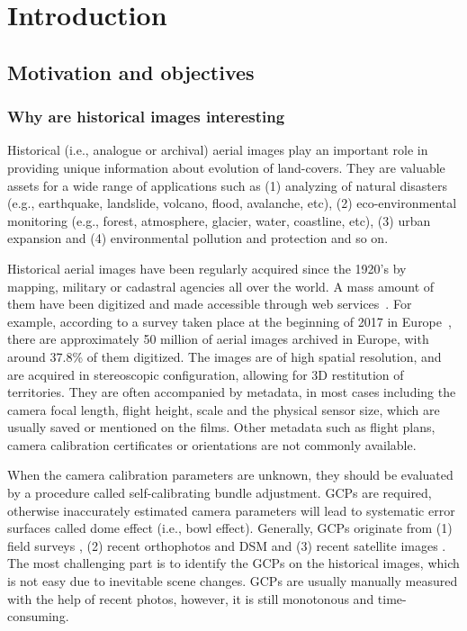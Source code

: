 
\chapter{Introduction}
\label{chap:intro}
\minitoc

\section{Motivation and objectives}
\subsection{Why are historical images interesting}
Historical (i.e., analogue or archival) aerial images play an important role in providing unique information about evolution of land-covers. 
They are valuable assets for a wide range of applications such as (1) analyzing of natural disasters (e.g., earthquake, landslide, volcano, flood, avalanche, etc), (2) eco-environmental monitoring (e.g., forest, atmosphere, glacier, water, coastline, etc), (3) urban expansion and (4) environmental pollution and protection and so on.
\par
Historical aerial images have been regularly acquired since the 1920’s by mapping, military or cadastral agencies all over the world. A mass amount of them have been digitized and made accessible through web services~\cite{sebastien2019archiving,earthexplorer,remonterletemps}. 
For example, according to a survey taken place at the beginning of 2017 in Europe~\cite{sebastien2019archiving}, there are approximately 50 million of aerial images archived in Europe, with around 37.8\% of them digitized. 
The images are of high spatial resolution, and are acquired in stereoscopic configuration, allowing for 3D restitution of territories. 
They are often accompanied by metadata, in most cases including the camera focal length, flight height, scale and the physical sensor size, which are usually saved or mentioned on the films. Other metadata such as flight plans, camera calibration certificates or orientations are not commonly available. 
\par
When the camera calibration parameters are unknown, they should be evaluated by a procedure called self-calibrating bundle adjustment. \ac{GCP}s are required, otherwise inaccurately estimated camera parameters will lead to systematic error surfaces called dome effect (i.e., bowl effect).
Generally, \ac{GCP}s originate from (1) field surveys \cite{micheletti2015application,walstra2004time,cardenal2006use}, (2) recent orthophotos and \ac{DSM} \cite{nurminen2015automation,ellis2006measuring,fox2008unlocking} and (3) recent satellite images \cite{ellis2006measuring,ford2013shoreline}. The most challenging part is to identify the \ac{GCP}s on the historical images, which is not easy due to inevitable scene changes. \ac{GCP}s are usually manually measured with the help of recent photos, however, it is still monotonous and time-consuming. 
